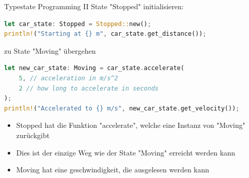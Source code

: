 \begin{frame}[fragile,t]{Typestate Programming II}
    State "Stopped" initialisieren:
    \begin{lstlisting}[language=Rust,escapechar=@,label={lst:typestate-programming-2-1}]
let car_state: Stopped = Stopped::new();
println!("Starting at {} m", car_state.get_distance());
\end{lstlisting}


    \pause zu State "Moving" übergehen
    \begin{lstlisting}[language=Rust,escapechar=@,label={lst:typestate-programming-2-2}]
let new_car_state: Moving = car_state.accelerate(
    5, // acceleration in m/s^2
    2 // how long to accelerate in seconds
);
println!("Accelerated to {} m/s", new_car_state.get_velocity());
\end{lstlisting}

     {
        \begin{itemize}
            \item Stopped hat die Funktion "accelerate", welche eine Instanz von "Moving" zurückgibt
            \item Dies ist der einzige Weg wie der State "Moving" erreicht werden kann
            \item Moving hat eine geschwindigkeit, die ausgelesen werden kann
        \end{itemize}
    }
\end{frame}



